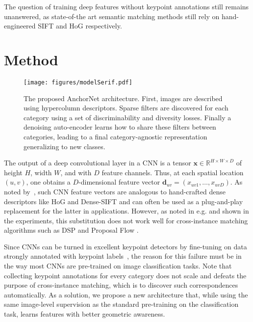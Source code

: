 \documentclass[10pt,twocolumn,letterpaper]{article}
\newcommand{\bx}{\mathbf{x}}
\begin{document}
The question of training deep features without keypoint annotations still remains unanswered, as state-of-the art semantic matching methods \cite{kim2013deformable,ham2016} still rely on hand-engineered SIFT and HoG respectively.
\section{Method}\label{sec:method}\begin{figure*}[ht!]
  \centering
  \texttt{[image: figures/modelSerif.pdf]}
  \caption{The proposed AnchorNet architecture. First, images are described using hypercolumn descriptors. Sparse filters are discovered for each category using a set of discriminability and diversity losses. Finally a denoising auto-encoder learns how to share these filters between categories, leading to a final category-agnostic representation generalizing to new classes.}
  \label{fig:architecture}
  \vspace{-0.2cm}
\end{figure*}

The output of a deep convolutional layer in a CNN is a tensor $\bx \in \mathbb{R}^{H\times W\times D}$ of height $H$, width $W$, and with $D$ feature channels. Thus, at each spatial location $(u,v)$, one obtains a $D$-dimensional feature vector $\mathbf{d}_{uv} = (x_{uv1}, \dots, x_{uvD})$. As noted by~\cite{cimpoi15deep}, such CNN feature vectors are analogous to hand-crafted dense descriptors like HoG and Dense-SIFT and can often be used as a plug-and-play replacement for the latter in applications. However, as noted in e.g. \cite{long2014do} and shown in the experiments, this substitution does not work well for cross-instance matching algorithms such as DSP \cite{kim2013deformable} and Proposal Flow \cite{ham2016}.

Since CNNs can be turned in excellent keypoint detectors by fine-tuning on data strongly annotated with keypoint labels~\cite{choy16universal,tulsiani2015viewpoints}, the reason for this failure must be in the way most CNNs are pre-trained on image classification tasks. Note that collecting keypoint annotations for every category does not scale and defeats the purpose of cross-instance matching, which is to discover such correspondences automatically. As a solution, we propose a new architecture that, while using the same image-level supervision as the standard pre-training on the classification task, learns features with better geometric awareness.
\end{document}
